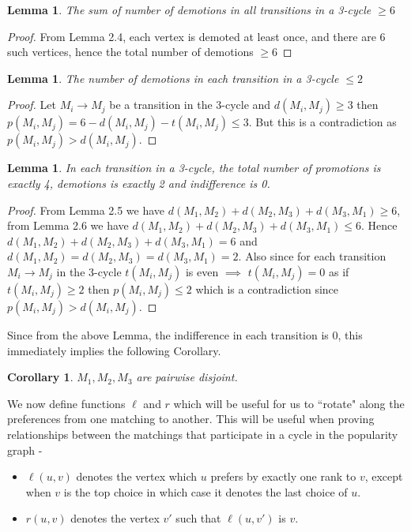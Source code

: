 \documentclass[a4paper,10pt]{article}
\theoremstyle{plain} %
\newtheorem{lemma}[theorem]{Lemma} %
\newtheorem{corollary}[theorem]{Corollary} %
\theoremstyle{plain} %
\begin{document}
\begin{lemma}
    The sum of number of demotions in all transitions in a 3-cycle $\geq 6$
\end{lemma}

\begin{proof}
        From Lemma 2.4, each vertex is demoted at least once, and there are 6 such vertices, hence the total number of demotions $\geq 6$
\end{proof}

\begin{lemma}
    The number of demotions in each transition in a 3-cycle $ \leq 2$
\end{lemma}

\begin{proof}
    Let $M_i \rightarrow M_j$ be a transition in the 3-cycle and $d(M_i, M_j) \geq 3$ then $p(M_i, M_j) = 6 - d(M_i, M_j) - t(M_i, M_j) \leq 3$. But this is a contradiction as $p(M_i, M_j) > d(M_i, M_j)$.
\end{proof}

\begin{lemma}
    In each transition in a 3-cycle, the total number of promotions is exactly 4, demotions is exactly 2 and indifference is 0.
\end{lemma}

\begin{proof}
    From Lemma 2.5 we have $d(M_1, M_2) + d(M_2, M_3) + d(M_3, M_1) \geq 6$, from Lemma 2.6 we have $d(M_1, M_2) + d(M_2, M_3) + d(M_3, M_1) \leq 6$.  Hence $d(M_1, M_2) + d(M_2, M_3) + d(M_3, M_1) = 6$ and $d(M_1, M_2) = d(M_2, M_3) = d(M_3, M_1) = 2$. Also since for each transition $M_i \rightarrow M_j$ in the 3-cycle $t(M_i, M_j)$ is even $\implies$ $t(M_i, M_j) = 0$ as if $t(M_i, M_j) \geq 2$ then $p(M_i, M_j) \leq 2$ which is a contradiction since $p(M_i, M_j) > d(M_i, M_j)$.
\end{proof}

Since from the above Lemma, the indifference in each transition is 0, this immediately implies the following Corollary.

\begin{corollary}
$M_1, M_2, M_3$ are pairwise disjoint.
\end{corollary}

We now define functions $\ell$ and $r$ which will be useful for us to ``rotate" along the preferences from one matching to another. This will be useful when proving relationships between the matchings that participate in a cycle in the popularity graph -
\begin{itemize}
    \item $\ell(u, v)$ denotes the vertex which $u$ prefers by exactly one rank to $v$, except when $v$ is the top choice in which case it denotes the last choice of $u$.
    \item $r(u, v)$ denotes the vertex $v'$ such that $\ell(u, v')$ is $v$.
\end{itemize}
\end{document}
